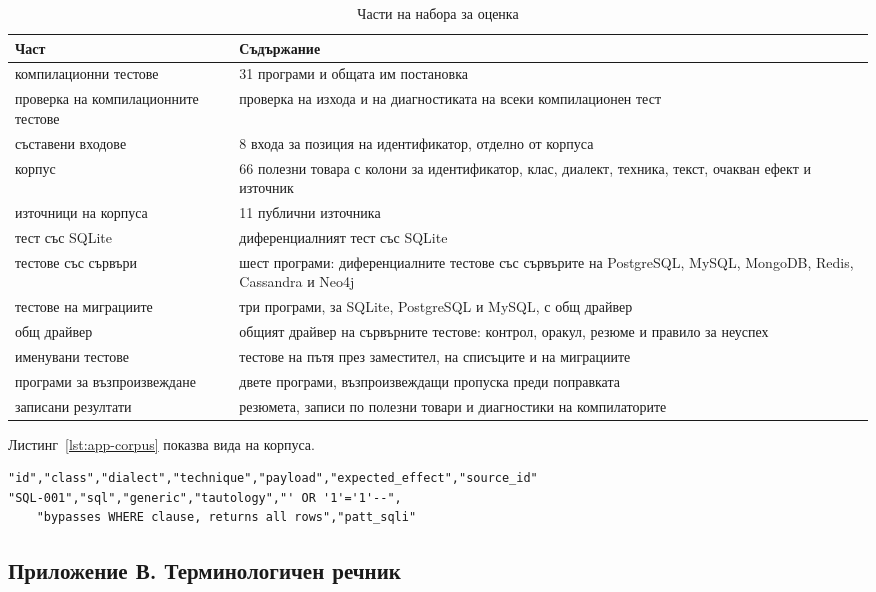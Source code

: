 \begin{table}[H]
\centering
\caption{Части на набора за оценка}
\label{tab:app-files}
\begin{tabularx}{\textwidth}{L{5.4cm}Y}
\toprule
\textbf{Част} & \textbf{Съдържание} \\
\midrule
компилационни тестове & 31 програми и общата им постановка \\
проверка на компилационните тестове & проверка на изхода и на диагностиката на всеки компилационен тест \\
съставени входове & 8 входа за позиция на идентификатор, отделно от корпуса \\
корпус & 66 полезни товара с колони за идентификатор, клас, диалект, техника, текст, очакван ефект и източник \\
източници на корпуса & 11 публични източника \\
тест със SQLite & диференциалният тест със SQLite \\
тестове със сървъри & шест програми: диференциалните тестове със сървърите на PostgreSQL, MySQL, MongoDB, Redis, Cassandra и Neo4j \\
тестове на миграциите & три програми, за SQLite, PostgreSQL и MySQL, с общ драйвер \\
общ драйвер & общият драйвер на сървърните тестове: контрол, оракул, резюме и правило за неуспех \\
именувани тестове & тестове на пътя през заместител, на списъците и на миграциите \\
програми за възпроизвеждане & двете програми, възпроизвеждащи пропуска преди поправката \\
записани резултати & резюмета, записи по полезни товари и диагностики на компилаторите \\
\bottomrule
\end{tabularx}
\end{table}

Листинг~\ref{lst:app-corpus} показва вида на корпуса.

\begin{lstlisting}[language={},deletekeywords={orm},caption={Заглавен ред и първи запис на корпуса (записът е пренесен)},label={lst:app-corpus}]
"id","class","dialect","technique","payload","expected_effect","source_id"
"SQL-001","sql","generic","tautology","' OR '1'='1'--",
    "bypasses WHERE clause, returns all rows","patt_sqli"
\end{lstlisting}

\subsection*{Приложение В. Терминологичен речник}

